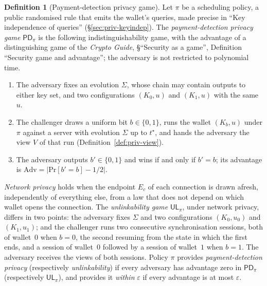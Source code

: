 \documentclass[11pt,a4paper]{article}
\theoremstyle{definition}
\newtheorem{definition}[theorem]{Definition}
\renewcommand{\Pr}{\mathrm{Pr}}
\begin{document}
\begin{definition}[Payment-detection privacy game]\label{def:priv-goal}
Let $\pi$ be a scheduling policy, a public randomised rule that emits the
wallet's queries, made precise in ``Key independence of queries''
(\S\ref{sec:priv-keyindep}). The \emph{payment-detection privacy game}
$\mathsf{PD}_\pi$ is the following indistinguishability game, with the
advantage of a distinguishing game of the \emph{Crypto Guide},
\S``Security as a game'', Definition ``Security game and advantage''; the
adversary is not restricted to polynomial time.
\begin{enumerate}
\item The adversary fixes an evolution $\Sigma$, whose chain may contain
  outputs to either key set, and two configurations $(K_0, u)$ and
  $(K_1, u)$ with the same $u$.
\item The challenger draws a uniform bit $b \in \{0, 1\}$, runs the wallet
  $(K_b, u)$ under $\pi$ against a server with evolution $\Sigma$ up to
  $t^{\star}$, and hands the adversary the view $V$ of that run
  (Definition~\ref{def:priv-view}).
\item The adversary outputs $b' \in \{0, 1\}$ and wins if and only if
  $b' = b$; its advantage is $\mathrm{Adv} = |\Pr[b' = b] - 1/2|$.
\end{enumerate}
\emph{Network privacy} holds when the endpoint $E_c$ of each connection is
drawn afresh, independently of everything else, from a law that does not
depend on which wallet opens the connection. The \emph{unlinkability game}
$\mathsf{UL}_\pi$, under network privacy, differs in two points: the
adversary fixes $\Sigma$ and two configurations $(K_0, u_0)$ and
$(K_1, u_1)$; and the challenger runs two consecutive synchronisation
sessions, both of wallet~$0$ when $b = 0$, the second resuming from the
state in which the first ends, and a session of wallet~$0$ followed by a
session of wallet~$1$ when $b = 1$. The adversary receives the views of both
sessions. Policy $\pi$ provides \emph{payment-detection privacy}
(respectively \emph{unlinkability}) if every adversary has advantage zero in
$\mathsf{PD}_\pi$ (respectively $\mathsf{UL}_\pi$), and provides it
\emph{within} $\varepsilon$ if every advantage is at most $\varepsilon$.
\end{definition}
\end{document}
